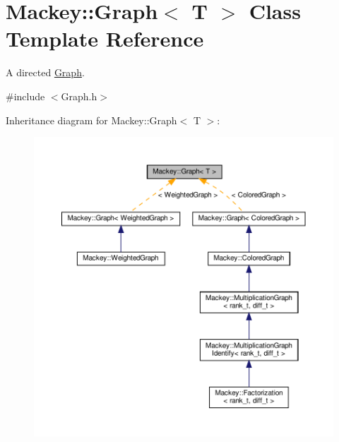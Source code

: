 \hypertarget{classMackey_1_1Graph}{}\section{Mackey\+:\+:Graph$<$ T $>$ Class Template Reference}
\label{classMackey_1_1Graph}


A directed \hyperlink{classMackey_1_1Graph}{Graph}.  




{\ttfamily \#include $<$Graph.\+h$>$}



Inheritance diagram for Mackey\+:\+:Graph$<$ T $>$\+:\nopagebreak
\begin{figure}[H]
\begin{center}
\leavevmode
\includegraphics[width=350pt]{classMackey_1_1Graph__inherit__graph}
\end{center}
\end{figure}
